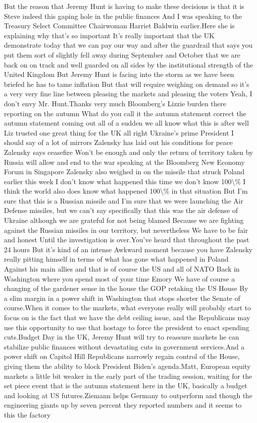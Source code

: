 \documentclass{article}%
\begin{document}
But the reason that Jeremy Hunt is having to make these decisions is that it is Steve indeed this gaping hole in the public finances And I was speaking to the Treasury Select Committee Chairwoman Harriet Baldwin earlier.Here she is explaining why that's so important It's really important that the UK demonstrate today that we can pay our way and after the guardrail that says you put them sort of slightly fell away during September and October that we are back on on track and well guarded on all sides by the institutional strength of the United Kingdom But Jeremy Hunt is facing into the storm as we have been briefed he has to tame inflation But that will require weighing on demand so it's a very very fine line between pleasing the markets and pleasing the voters Yeah, I don't envy Mr. Hunt.Thanks very much Bloomberg's Lizzie burden there reporting on the autumn What do you call it the autumn statement correct the autumn statement coming out all of a sudden we all know what this is after well Liz trusted one great thing for the UK all right Ukraine's prime President I should say of a lot of mirrors Zalensky has laid out his conditions for peace Zalensky says ceasefire Won't be enough and only the return of territory taken by Russia will allow and end to the war speaking at the Bloomberg New Economy Forum in Singapore Zalensky also weighed in on the missile that struck Poland earlier this week I don't know what happened this time we don't know 100\textbackslash{}\% I think the world also does know what happened 100\textbackslash{}\% in that situation But I'm sure that this is a Russian missile and I'm sure that we were launching the Air Defense missiles, but we can't say specifically that this was the air defense of Ukraine although we are grateful for not being blamed Because we are fighting against the Russian missiles in our territory, but nevertheless We have to be fair and honest Until the investigation is over.You've heard that throughout the past 24 hours But it's kind of an intense Awkward moment because you have Zalensky really pitting himself in terms of what has gone what happened in Poland Against his main allies and that is of course the US and all of NATO Back in Washington where you spend most of your time Emory We have of course a changing of the gardener sense in the house the GOP retaking the US House By a slim margin in a power shift in Washington that stops shorter the Senate of course.When it comes to the markets, what everyone really will probably start to focus on is the fact that we have the debt ceiling issue, and the Republicans may use this opportunity to use that hostage to force the president to enact spending cuts.Budget Day in the UK, Jeremy Hunt will try to reassure markets he can stabilize public finances without devastating cuts in government services.And a power shift on Capitol Hill Republicans narrowly regain control of the House, giving them the ability to block President Biden's agenda.Matt, European equity markets a little bit weaker in the early part of the trading session, waiting for the set piece event that is the autumn statement here in the UK, basically a budget and looking at US futures.Ziemann helps Germany to outperform and though the engineering giants up by seven percent they reported numbers and it seems to this the factory 
\end{document}
